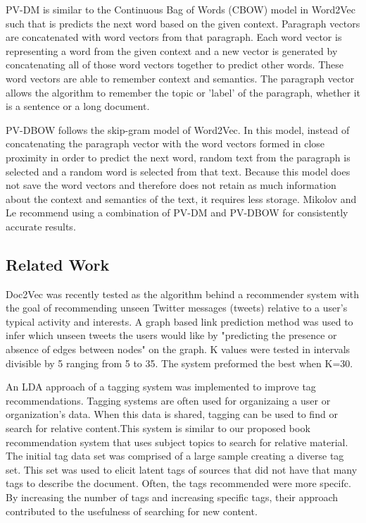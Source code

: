 PV-DM is similar to the Continuous Bag of Words (CBOW) model in Word2Vec such that is predicts the next word based on the given context. Paragraph vectors are concatenated with word vectors from that paragraph.  Each word vector is representing a word from the given context and a new vector is generated by concatenating all of those word vectors together to predict other words. These word vectors are able to remember context and semantics. The paragraph vector allows the algorithm to remember the topic or 'label' of the paragraph, whether it is a sentence or a long document. 

PV-DBOW follows the skip-gram model of Word2Vec. In this model, instead of concatenating the paragraph vector with the word vectors formed in close proximity in order to predict the next word, random text from the paragraph is selected and a random word is selected from that text. Because this model does not save the word vectors and therefore does not retain as much information about the context and semantics of the text, it requires less storage. Mikolov and Le recommend using a combination of PV-DM and PV-DBOW for consistently accurate results.  \cite{RefWorks:doc:5a6e5746e4b0d609eec798d7}


\subsection{Related Work}

Doc2Vec was recently tested as the algorithm behind a recommender system with the goal of recommending unseen Twitter messages (tweets) relative to a user's typical activity and interests. A graph based link prediction method was used to infer which unseen tweets the users would like by "predicting the presence or absence of edges between nodes" on the graph.  \cite{RefWorks:doc:5a6e5746e4b0d609eec798d9} K values were tested in intervals divisible by 5 ranging from 5 to 35. The system preformed the best when K=30.

An LDA approach of a tagging system was implemented to improve tag recommendations. \cite{RefWorks:doc:5a73e055e4b0cf1dd767b18f} Tagging systems are often used for organizaing a user or organization's data. When this data is shared, tagging can be used to find or search for relative content.This system is similar to our proposed book recommendation system that uses subject topics to search for relative material. The initial tag data set was comprised of a large sample creating a diverse tag set. This set was used to elicit latent tags of sources that did not have that many tags to describe the document. Often, the tags recommended were more specifc. By increasing the number of tags and increasing specific tags, their approach contributed to the usefulness of searching for new content. 



